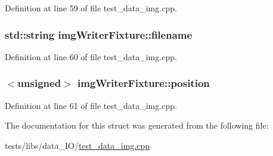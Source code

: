 Definition at line 59 of file test\-\_\-data\-\_\-img.\-cpp.

\hypertarget{structimg_writer_fixture_a65a9582a28ef880a42f7b704c5795c45}{
\subsubsection[{filename}]{\setlength{\rightskip}{0pt plus 5cm}std\-::string img\-Writer\-Fixture\-::filename}}\label{structimg_writer_fixture_a65a9582a28ef880a42f7b704c5795c45}


Definition at line 60 of file test\-\_\-data\-\_\-img.\-cpp.

\hypertarget{structimg_writer_fixture_a3bc6e6fc39f0768d1285cd3112867f26}{
\subsubsection[{position}]{$<$unsigned$>$ img\-Writer\-Fixture\-::position}}\label{structimg_writer_fixture_a3bc6e6fc39f0768d1285cd3112867f26}


Definition at line 61 of file test\-\_\-data\-\_\-img.\-cpp.



The documentation for this struct was generated from the following file\-:\begin{DoxyCompactItemize}
\item 
tests/libs/data\-\_\-\-I\-O/\hyperlink{test__data__img_8cpp}{test\-\_\-data\-\_\-img.\-cpp}\end{DoxyCompactItemize}
